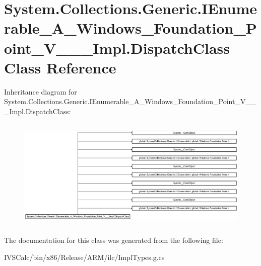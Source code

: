 \hypertarget{class_system_1_1_collections_1_1_generic_1_1_i_enumerable___a___windows___foundation___point___v_______impl_1_1_dispatch_class}{}\section{System.\+Collections.\+Generic.\+I\+Enumerable\+\_\+\+A\+\_\+\+Windows\+\_\+\+Foundation\+\_\+\+Point\+\_\+\+V\+\_\+\+\_\+\+\_\+\+Impl.\+Dispatch\+Class Class Reference}
\label{class_system_1_1_collections_1_1_generic_1_1_i_enumerable___a___windows___foundation___point___v_______impl_1_1_dispatch_class}
Inheritance diagram for System.\+Collections.\+Generic.\+I\+Enumerable\+\_\+\+A\+\_\+\+Windows\+\_\+\+Foundation\+\_\+\+Point\+\_\+\+V\+\_\+\+\_\+\+\_\+\+Impl.\+Dispatch\+Class\+:\begin{figure}[H]
\begin{center}
\leavevmode
\includegraphics[height=5.403509cm]{class_system_1_1_collections_1_1_generic_1_1_i_enumerable___a___windows___foundation___point___v_______impl_1_1_dispatch_class}
\end{center}
\end{figure}


The documentation for this class was generated from the following file\+:\begin{DoxyCompactItemize}
\item 
I\+V\+S\+Calc/bin/x86/\+Release/\+A\+R\+M/ilc/Impl\+Types.\+g.\+cs\end{DoxyCompactItemize}
